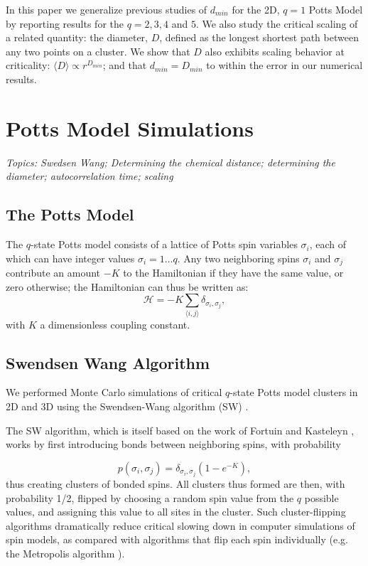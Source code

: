 \documentclass[pre,preprint]{revtex4}
\newcommand{\lb}{{\langle}}
\newcommand{\rb}{{\rangle}}
\begin{document}
In this paper we generalize previous studies of $d_{min}$ for the 2D, $q=1$ Potts Model by reporting results for the $q = 2, 3, 4$ and $5$.  We also study the critical scaling of a related quantity: the diameter, $D$, defined as the longest shortest path between any two points on a cluster.
We show that $D$ also exhibits scaling behavior at criticality: $\langle D \rangle \propto r^{D_{min}}$; and that $d_{min} = D_{min}$ to within the error in our numerical results. 


\section{Potts Model Simulations}
{\it Topics: Swedsen Wang; Determining the chemical distance; determining the diameter; autocorrelation time; scaling}

\subsection{The Potts Model} %

The $q$-state Potts model consists of a lattice of Potts spin variables $\sigma_i$, each of which can have integer values $\sigma_i = 1 \dots q$.  Any two neighboring spins $\sigma_i$ and $\sigma_j$ contribute an amount $-K$ to the Hamiltonian if they have the same value, or zero otherwise; the Hamiltonian can thus be written as:
\begin{equation}
\mathcal{H} = -K \sum_{\lb i,j \rb} \delta_{\sigma_i, \sigma_j},
\end{equation}    
with $K$ a dimensionless coupling constant.


\subsection{Swendsen Wang Algorithm} %

We performed Monte Carlo simulations of critical $q$-state Potts model clusters in 2D and 3D using the Swendsen-Wang algorithm (SW) \cite{SwWa86, NeBa99}.  

The SW algorithm, which is itself based on the work of Fortuin and Kasteleyn \cite{FoKa}, works by first introducing bonds between neighboring spins, with probability 

\begin{equation}
p(\sigma_i,\sigma_j) = \delta_{\sigma_i, \sigma_j} (1-e^{-K}),
\end{equation}  
thus creating clusters of bonded spins.   All clusters thus formed are then, with probability 1/2, flipped by choosing a random spin value from the $q$ possible values, and assigning this value to all sites in the cluster.  Such cluster-flipping algorithms dramatically reduce critical slowing down in computer simulations of spin models, as compared with algorithms that flip each spin individually \cite{NeBa99} (e.g. the Metropolis algorithm \cite{Met}). 
\end{document}

